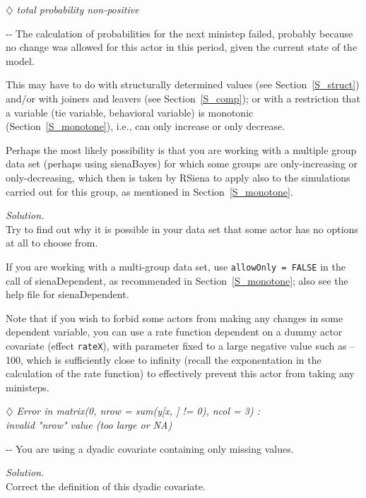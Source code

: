 \documentclass[a4paper,fleqn,11pt]{article}
\makeatletter
\newcommand{\+}{\, + \,}
\newcommand{\RS}{{\sf \textsf{RSiena} }}
\newenvironment{indentation}[2]
{\par \setlength{\leftmargin}{#1}       \setlength{\rightmargin}{#2}
  \advance\linewidth -\leftmargin       \advance\linewidth -\rightmargin
  \advance\@totalleftmargin\leftmargin  \@setpar{{\@@par}}%
  \parshape 1 \@totalleftmargin         \linewidth \ignorespaces}{\par}
\makeatother
\begin{document}
\noindent $\diamondsuit$ \emph{total probability non-positive}\\
\smallskip

\begin{indentation}{0.04\textwidth}{0pt}
\noindent
The calculation of probabilities for the next ministep failed,
probably because no change was allowed for this actor in this period,
given the current state of the model.

This may have to do with structurally determined values
(see Section~\ref{S_struct})
and/or with joiners and leavers (see Section~\ref{S_comp});
or with a restriction that a variable (tie variable, behavioral variable)
is monotonic (Section~\ref{S_monotone}), i.e., can only
increase or only decrease.

Perhaps the most likely possibility is that you are working with a
multiple group data set (perhaps using \textsf{sienaBayes})
for which some groups are only-increasing or only-decreasing,
which then is taken by \RS to apply also to the simulations carried
out for this group, as mentioned in Section~\ref{S_monotone}.
\smallskip

\noindent
\emph{Solution.} \\
Try to find out why it is possible in your data set
that some actor has no options at all to choose from.

If you are working with a multi-group data set, use
\texttt{allowOnly = FALSE} in the call of \textsf{sienaDependent},
as recommended in Section~\ref{S_monotone}; also see the help file for
\textsf{sienaDependent}.

Note that if you wish to forbid some actors from making any changes
in some dependent variable, you can use a rate function dependent
on a dummy actor covariate (effect \texttt{rateX}), with parameter fixed
to a large negative value such as --100, which is sufficiently close to
infinity (recall the exponentation in the calculation of the rate function)
to effectively prevent this actor from taking any ministeps.
\end{indentation}
\bigskip

\noindent $\diamondsuit$ \emph{
Error in matrix(0, nrow = sum(y[x, ] != 0), ncol = 3) :\\
  invalid "nrow" value (too large or NA) }
\smallskip

\begin{indentation}{0.04\textwidth}{0pt}
\noindent
You are using a dyadic covariate containing only missing values.
\smallskip

\noindent
\emph{Solution.} \\
Correct the definition of this dyadic covariate.
\end{indentation}
\bigskip
\end{document}
